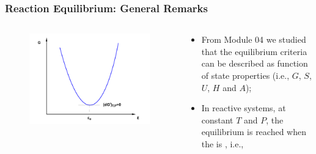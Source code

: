 \documentclass[10pt,compress,unknownkeysallowed]{beamer}
\begin{document}
\begin{frame}
  \frametitle{Reaction Equilibrium: General Remarks}
  \begin{columns}
     \begin{column}[l]{0.5\linewidth}\scriptsize
      \begin{figure}%
        \begin{center}
          \includegraphics[width=1.05\columnwidth,clip]{./../Pics/ChemicalReactions_GxPlot}
        \end{center}
      \end{figure}
     \end{column}
     \begin{column}[l]{0.5\linewidth}%
        \begin{itemize} 
           \item<1-> From Module 04 we studied that the equilibrium criteria can be described as function of state properties (i.e., $G$, $S$, $U$, $H$ and $A$);
           \item<2-> In reactive systems, at constant $T$ and $P$, the equilibrium is reached when the  is , i.e., 
        \end{itemize}
     \end{column}
  \end{columns}
\end{frame}
\normalsize
\end{document}
